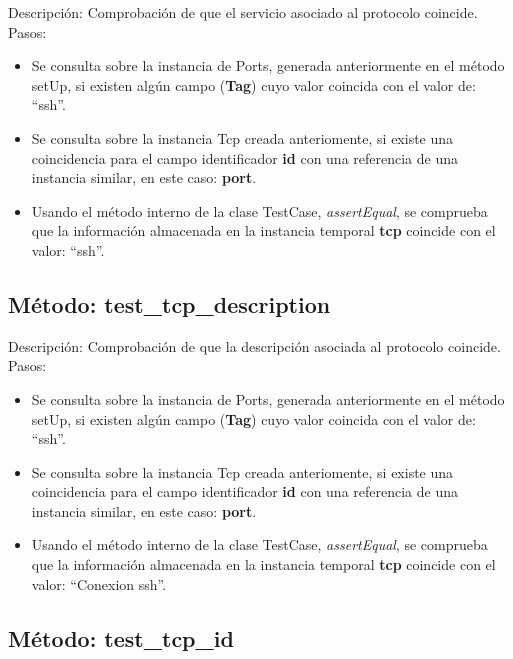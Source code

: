 Descripción: Comprobación de que el servicio asociado al protocolo coincide.\\
Pasos:
\begin{itemize}
\item Se consulta sobre la instancia de Ports, generada anteriormente en el método setUp, si existen algún campo (\textbf{Tag}) cuyo valor coincida con el valor de: ``ssh''.
\item Se consulta sobre la instancia Tcp creada anteriomente, si existe una coincidencia para el campo identificador \textbf{id} con una referencia de una instancia similar, en este caso: \textbf{port}.
\item Usando el método interno de la clase TestCase, \emph{assertEqual}, se comprueba que la información almacenada en la instancia temporal \textbf{tcp} coincide con el valor: ``ssh''.
\end{itemize}



\subsection{\quad Método: test\_tcp\_description}

Descripción: Comprobación de que la descripción asociada al protocolo coincide.\\
Pasos:
\begin{itemize}
\item Se consulta sobre la instancia de Ports, generada anteriormente en el método setUp, si existen algún campo (\textbf{Tag}) cuyo valor coincida con el valor de: ``ssh''.
\item Se consulta sobre la instancia Tcp creada anteriomente, si existe una coincidencia para el campo identificador \textbf{id} con una referencia de una instancia similar, en este caso: \textbf{port}.
\item Usando el método interno de la clase TestCase, \emph{assertEqual}, se comprueba que la información almacenada en la instancia temporal \textbf{tcp} coincide con el valor: ``Conexion ssh''.
\end{itemize}



\subsection{\quad Método: test\_tcp\_id}

